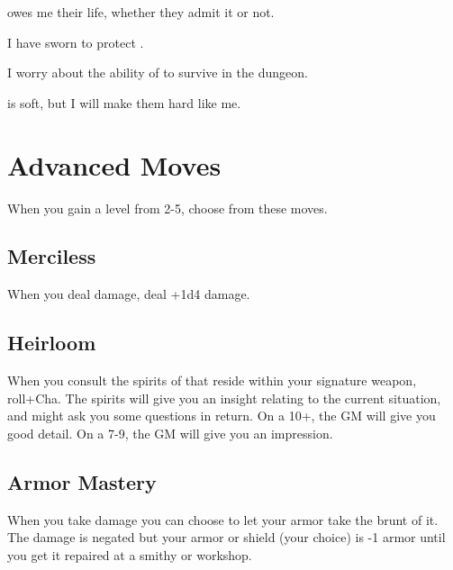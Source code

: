 \thinrules[n=2] owes me their life, whether they admit it or not.

         

I have sworn to protect \thinrules[n=2].

         

I worry about  the ability of \thinrules[n=2] to survive in the dungeon.

         

\thinrules[n=2] is soft, but I will make them hard like me.

       

       
\section{Advanced Moves}    
       

         
\startInstructionsAfterHeader
When you gain a level from 2-5, choose from these moves.
\stopInstructionsAfterHeader
         
\subsection{Merciless}   
         

When you deal damage, deal +1d4 damage.

         
\subsection{Heirloom}   
         

When you consult the spirits of that reside within your signature weapon, roll+Cha. The spirits will give you an insight relating to the current situation, and might ask you some questions in return. On a 10+, the GM will give you good detail. On a 7-9, the GM will give you an impression.

         
\subsection{Armor Mastery}    
         

When you take damage you can choose to let your armor take the brunt of it. The damage is negated but your armor or shield (your choice) is -1 armor until you get it repaired at a smithy or workshop.

